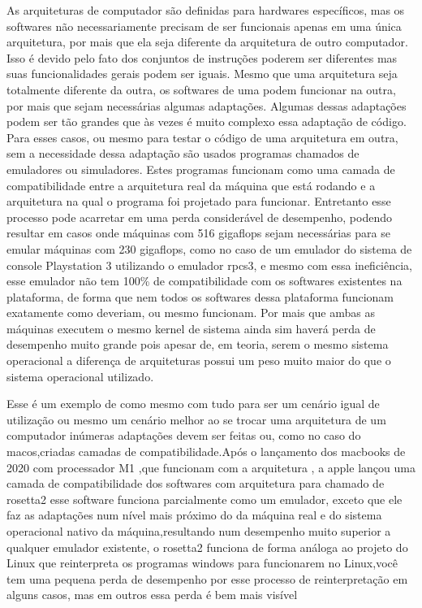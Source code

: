 \documentclass[
	12pt,				%
	openright,			%
	oneside,			%
	a4paper,			%
	english,			%
	french,				%
	spanish,			%
	brazil,				%
	]{abntex2}
\begin{document}
As arquiteturas de computador são definidas para hardwares específicos, mas os softwares não necessariamente precisam de ser funcionais apenas em uma única arquitetura, por mais que ela seja diferente da arquitetura de outro computador.
Isso é devido pelo fato dos conjuntos de instruções poderem ser diferentes mas suas funcionalidades gerais podem ser iguais. Mesmo que uma arquitetura seja totalmente diferente da outra, os softwares de uma podem funcionar na outra,
por mais que sejam necessárias algumas adaptações. Algumas dessas adaptações podem ser tão grandes que às vezes é muito complexo essa adaptação de código. Para esses casos, ou mesmo para testar o código de uma arquitetura em outra,
sem a necessidade dessa adaptação são usados programas chamados de emuladores ou simuladores.
Estes programas funcionam como uma camada de compatibilidade entre a arquitetura real da máquina que está rodando e a arquitetura na qual o programa foi projetado para funcionar.
Entretanto esse processo pode acarretar em uma perda considerável de desempenho, podendo resultar em casos onde máquinas com  516 gigaflops sejam necessárias para se emular máquinas com 230 gigaflops,
como no caso de um emulador do sistema de console Playstation 3 utilizando o emulador rpcs3, e mesmo com essa ineficiência, esse emulador não tem 100\% de compatibilidade com os softwares existentes na plataforma,
de forma que nem todos os softwares dessa plataforma funcionam exatamente como deveriam, ou mesmo funcionam. Por mais que ambas as máquinas executem o mesmo kernel de sistema ainda sim haverá perda de desempenho muito grande pois apesar de, 
em teoria, serem o mesmo sistema operacional a diferença de arquiteturas possui um peso muito maior do que o sistema operacional utilizado.\newline

Esse é um exemplo de como mesmo com tudo para ser um cenário igual de utilização ou mesmo um cenário melhor ao se trocar uma arquitetura de um computador inúmeras adaptações devem ser feitas ou,
como no caso do macos,criadas camadas de compatibilidade.Após o lançamento dos macbooks de 2020 com processador M1 ,que funcionam com a arquitetura ,
a apple lançou uma camada de compatibilidade dos softwares com arquitetura  para  chamado de rosetta2 esse software funciona parcialmente como um emulador,
exceto que ele faz as adaptações num nível mais próximo do da máquina real e do sistema operacional nativo da máquina,resultando num desempenho muito superior a qualquer emulador existente,
o rosetta2 funciona de forma análoga ao projeto  do Linux que reinterpreta os programas windows para funcionarem no Linux,você tem uma pequena perda de desempenho por esse processo de reinterpretação em alguns casos,
mas em outros essa perda é bem mais visível\newline
\end{document}
